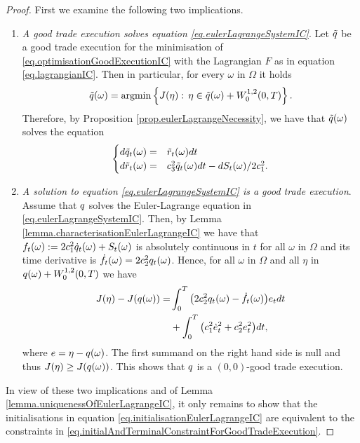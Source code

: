 \documentclass[10pt,a4paper]{article}
\begin{document}
	\begin{proof}
		First we examine the following two implications.
		\begin{enumerate}
			\item \emph{A good trade execution solves equation \eqref{eq.eulerLagrangeSystemIC}}. Let $\tilde{q}$ be a good trade execution for the minimisation of \eqref{eq.optimisationGoodExecutionIC} with the Lagrangian $F$ as in equation \eqref{eq.lagrangianIC}. Then in particular, for every $\omega$ in $\Omega$ it holds
			\begin{equation*}
			\tilde{q}(\omega) = \mathrm{argmin} \left\lbrace J(\eta):\, \eta \in \tilde{q}(\omega) + W^{1,2}_{0}(0,T) \right\rbrace.
			\end{equation*}
			Therefore, by Proposition \ref{prop.eulerLagrangeNecessity}, we have that $\tilde{q}(\omega)$ solves the equation
			\begin{equation*}
			\begin{cases}
			d\tilde{q}_t(\omega)=&   \tilde{r}_t(\omega)dt \\
			d\tilde{r}_t(\omega)=& c_{3}^{2} \tilde{q}_t(\omega)dt - dS_t(\omega)/2c_{1}^{2}.
			\end{cases}
			\end{equation*}
			\item \emph{A solution to equation \eqref{eq.eulerLagrangeSystemIC} is a good trade execution}. Assume that $q$ solves the Euler-Lagrange equation in \eqref{eq.eulerLagrangeSystemIC}. Then, by Lemma \ref{lemma.characterisationEulerLagrangeIC} we have that $f_t(\omega):= 2c_{1}^{2} \dot{q}_t(\omega) + S_t(\omega)$ is absolutely continuous in $t$ for all $\omega$ in $\Omega$ and its time derivative  is $\dot{f}_t(\omega) = 2 c_{2}^{2} q_t(\omega)$. Hence, for  all $\omega$ in $\Omega$ and all $\eta$ in $q(\omega) + W^{1,2}_{0}(0,T)$ we have 
			\begin{equation*}
			\begin{split}
			J(\eta) - J(q(\omega)) = &
			\int_{0}^{T} \big(2c_{2}^{2} q_t(\omega) - \dot{f}_t (\omega) \big)e_t dt\\
			& + \int_{0}^{T} \big(c_{1}^{2} \dot{e}_t^{2} + c_{2}^{2} e_t^{2} \big) dt,
			\end{split}
			\end{equation*}
			where $e = \eta-q(\omega)$.  The first summand on the right hand side is null and thus $J(\eta)\geq J(q(\omega))$. This shows that $q$ is a $(0,0)$-good trade execution. 
		\end{enumerate}
		In view of these two implications and of Lemma \ref{lemma.uniquenessOfEulerLagrangeIC}, it only remains to show that the initialisations in equation \eqref{eq.initialisationEulerLagrangeIC} are equivalent to the constraints in \eqref{eq.initialAndTerminalConstraintForGoodTradeExecution}.
		

\end{proof}
\end{document}
